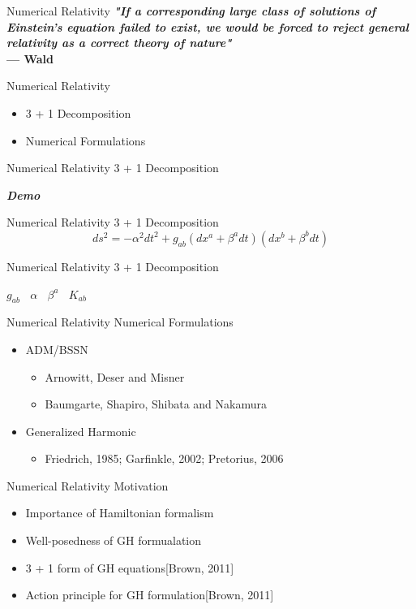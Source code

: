 \documentclass[xcolor=dvipsnames]{beamer}
\begin{document}
	\begin{frame}{Numerical Relativity}
		\textbf{\textit{"If a corresponding large class of solutions of Einstein’s equation failed to exist, we would be forced to reject general relativity as a correct theory of nature"}}\\
		\hfill \textbf{--- Wald}
	\end{frame}
	\begin{frame}{Numerical Relativity}
		\begin{itemize}
			\item{3 + 1 Decomposition}
			\item{Numerical Formulations}
		\end{itemize}
	\end{frame}
	\begin{frame}{Numerical Relativity}
		3 + 1 Decomposition
		\begin{center}
			\Huge{\textbf{\textit{Demo}}}
		\end{center}
	\end{frame}
	\begin{frame}{Numerical Relativity}
		3 + 1 Decomposition
		\Large
		\[
		ds^{2} = - \alpha^{2}dt^{2} + g_{ab}(dx^{a} + \beta^{a}dt)(dx^{b} + \beta^{b}dt) 		
		\]
	\end{frame}
	\begin{frame}{Numerical Relativity}
		3 + 1 Decomposition
		\begin{center}
			\Large
			$g_{ab}~~~~\alpha~~~~\beta^{a}~~~~K_{ab}$
		\end{center}
	\end{frame}
	\begin{frame}{Numerical Relativity}
		Numerical Formulations
		\begin{itemize}
			\pause
			\item{ADM/BSSN}
			\pause
			\begin{itemize}
				\item{Arnowitt, Deser and Misner}
			\pause
				\item{Baumgarte, Shapiro, Shibata and Nakamura}
			\end{itemize}
			\pause
			\item{Generalized Harmonic}
			\pause
			\begin{itemize}
				\item{Friedrich, 1985; Garfinkle, 2002; Pretorius, 2006}
			\end{itemize}
		\end{itemize}
	\end{frame}
	\begin{frame}{Numerical Relativity}
		Motivation
		\begin{itemize}
			\item{Importance of Hamiltonian formalism}
			\item{Well-posedness of GH formualation}
			\pause
			\item{3 + 1 form of GH equations[Brown, 2011]}
			\item{Action principle for GH formulation[Brown, 2011]}
		\end{itemize}
	\end{frame}
\end{document}
